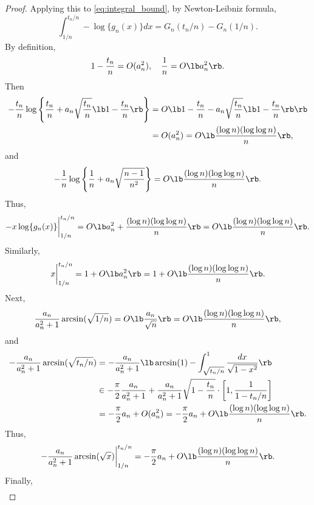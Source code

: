 \begin{proof}
  Applying this to \eqref{eq:integral_bound}, by Newton-Leibniz formula,
  \[\int_{1/n}^{t_n / n}-\log \{g_n(x)\}dx = G_n(t_n / n) - G_n(1 / n).\]
  By definition,
  \[1 - \frac{t_n}{n} = O(a_n^2), \quad \frac{1}{n} = O\lb a_n^2\rb.\]
  Then
  \begin{align*}
    -\frac{t_n}{n}\log\left\{\frac{t_n}{n} + a_n \sqrt{\frac{t_n}{n}}\lb 1 - \frac{t_n}{n}\rb\right\} &= O\lb 1 - \frac{t_n}{n} - a_n \sqrt{\frac{t_n}{n}}\lb 1 - \frac{t_n}{n}\rb\rb\\
    & = O(a_n^2) = O\lb\frac{(\log n)(\log \log n)}{n}\rb,
  \end{align*}
  and
  \begin{equation*}
    -\frac{1}{n}\log\left\{\frac{1}{n} + a_n\sqrt{\frac{n-1}{n^2}}\right\} = O\lb\frac{(\log n)(\log\log n)}{n}\rb.
  \end{equation*}
  Thus,
  \begin{equation}
    \label{eq:integral_1}
    -x\log \{g_n(x)\}\bigg|_{1/n}^{t_n/n} = O\lb a_n^2 + \frac{(\log n)(\log\log n)}{n}\rb =O\lb\frac{(\log n)(\log\log n)}{n}\rb.
  \end{equation}
  Similarly,
  \begin{equation}
    \label{eq:integral_2}
    x\bigg|_{1/n}^{t_n/n} = 1 + O\lb a_n^2\rb = 1 + O\lb\frac{(\log n)(\log\log n)}{n}\rb.
  \end{equation}
  Next,
  \begin{equation*}
    \frac{a_n}{a_n^2 + 1}\arcsin(\sqrt{1/n}) = O\lb\frac{a_n}{\sqrt{n}}\rb = O\lb\frac{(\log n)(\log\log n)}{n}\rb,
  \end{equation*}
  and
  \begin{align}
    -\frac{a_n}{a_n^2 + 1}\arcsin(\sqrt{t_n/n}) &= -\frac{a_n}{a_n^2+1}\lb \arcsin(1) - \int_{\sqrt{t_n/n}}^{1}\frac{dx}{\sqrt{1 - x^2}}\rb\nonumber\\
                              &\in -\frac{\pi}{2}\frac{a_n}{a_n^2 + 1} + \frac{a_n}{a_n^2 + 1}\sqrt{1 - \frac{t_n}{n}}\cdot \left[ 1, \frac{1}{1 - t_n / n}\right]\nonumber\\
    & = -\frac{\pi}{2}a_n + O(a_n^2) = -\frac{\pi}{2}a_n + O\lb\frac{(\log n)(\log\log n)}{n}\rb.\nonumber\label{eq:integral_4}
  \end{align}
  Thus,
  \begin{equation}
    \label{eq:integral_3}
    -\frac{a_n}{a_n^2 + 1}\arcsin(\sqrt{x})\bigg|_{1/n}^{t_n/n} = -\frac{\pi}{2}a_n + O\lb \frac{(\log n)(\log\log n)}{n}\rb.
  \end{equation}
  Finally,
  \begin{align*}

\end{align*}
\end{proof}
